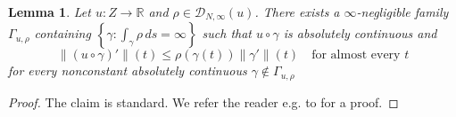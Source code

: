 \documentclass[reqno]{amsart}
\numberwithin{equation}{section}
\newtheorem{lemma}[theorem]{Lemma}
\theoremstyle{remark}
\begin{document}
\begin{lemma}\label{lemm:gradient:absolutecontinuity}
Let $u \colon Z \rightarrow \mathbb{R}$ and $\rho \in \mathcal{D}_{N,\infty}( u )$. There exists a $\infty$-negligible family $\Gamma_{u,\rho}$ containing $\left\{ \gamma \colon \int_{\gamma} \rho \, ds = \infty \right\}$ such that $u \circ \gamma$ is absolutely continuous and
\begin{equation}\label{eq:upper:abs}
    \| ( u \circ \gamma )' \|(t)
    \leq 
    \rho( \gamma(t) ) \| \gamma' \|(t)
    \quad\text{for almost every $t$}
\end{equation}
for every nonconstant absolutely continuous $\gamma \not\in \Gamma_{u,\rho}$
\end{lemma}
\begin{proof}
The claim is standard. We refer the reader e.g. to \cite[Lemma 3.5]{Garc:Iko:Zhu:23} for a proof.
\end{proof}
\end{document}
